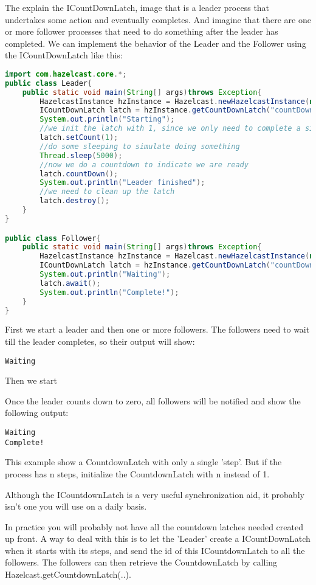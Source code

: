 The explain the ICountDownLatch, image that is a leader process that undertakes some action and eventually completes. And imagine that there are one or more follower processes that need to do something after the leader has completed. We can implement the behavior of the Leader and the Follower using the ICountDownLatch like this:
\begin{lstlisting}[language=java]
import com.hazelcast.core.*;
public class Leader{
    public static void main(String[] args)throws Exception{
        HazelcastInstance hzInstance = Hazelcast.newHazelcastInstance(null);
        ICountDownLatch latch = hzInstance.getCountDownLatch("countDownLatch");      
        System.out.println("Starting");
        //we init the latch with 1, since we only need to complete a single step.
        latch.setCount(1); 
        //do some sleeping to simulate doing something    
        Thread.sleep(5000);
        //now we do a countdown to indicate we are ready
        latch.countDown();
        System.out.println("Leader finished");
        //we need to clean up the latch
        latch.destroy();
    }
}

public class Follower{
    public static void main(String[] args)throws Exception{
        HazelcastInstance hzInstance = Hazelcast.newHazelcastInstance(null); 
        ICountDownLatch latch = hzInstance.getCountDownLatch("countDownLatch");
        System.out.println("Waiting");
        latch.await();
        System.out.println("Complete!");
    }
}
\end{lstlisting}
First we start a leader and then one or more followers. The followers need to wait till the leader completes, so their output will show:
\begin{lstlisting}
Waiting
\end{lstlisting}
Then we start 

Once the leader counts down to zero, all followers will be notified and show the following output:
\begin{lstlisting}
Waiting
Complete!
\end{lstlisting}
This example show a CountdownLatch with only a single 'step'. But if the process has n steps, initialize the CountdownLatch with n instead of 1.

Although the ICountdownLatch is a very useful synchronization aid, it probably isn't one you will use on a daily basis.

In practice you will probably not have all the countdown latches needed created up front. A way to deal with this is to let the 'Leader' create a ICountDownLatch when it starts with its steps, and send the id of this ICountdownLatch to all the followers. The followers can then retrieve the CountdownLatch by calling Hazelcast.getCountdownLatch(..).

